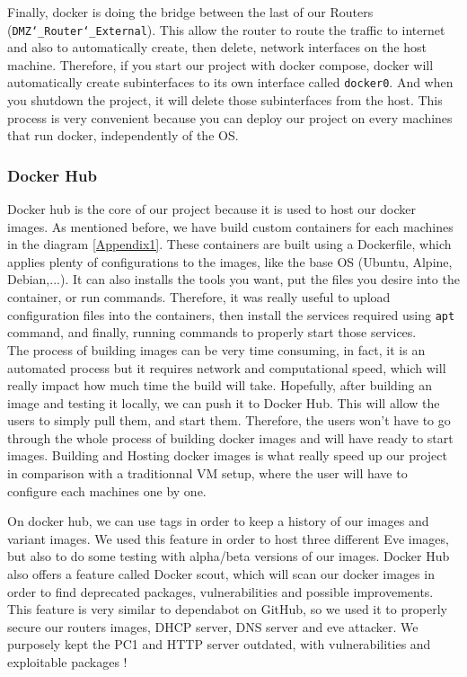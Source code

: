 \documentclass[a4paper,11pt,singlespacing]{article}
\begin{document}
Finally, docker is doing the bridge between the last of our Routers (\texttt{DMZ\char`_Router\char`_External}). This allow the router to route the traffic to internet and also to automatically create, then delete, network interfaces on the host machine. Therefore, if you start our project with docker compose, docker will automatically create subinterfaces to its own interface called \texttt{docker0}. And when you shutdown the project, it will delete those subinterfaces from the host. This process is very convenient because you can deploy our project on every machines that run docker, independently of the OS. 

\subsubsection{Docker Hub}
Docker hub is the core of our project because it is used to host our docker images. As mentioned before, we have build custom containers for each machines in the diagram \ref{Appendix1}. These containers are built using a Dockerfile, which applies plenty of configurations to the images, like the base OS (Ubuntu, Alpine, Debian,...). It can also installs the tools you want, put the files you desire into the container, or run commands. Therefore, it was really useful to upload configuration files into the containers, then install the services required using \texttt{apt} command, and finally, running commands to properly start those services.\\

The process of building images can be very time consuming, in fact, it is an automated process but it requires network and computational speed, which will really impact how much time the build will take. Hopefully, after building an image and testing it locally, we can push it to Docker Hub. This will allow the users to simply pull them, and start them. Therefore, the users won't have to go through the whole process of building docker images and will have ready to start images. Building and Hosting docker images is what really speed up our project in comparison with a traditionnal VM setup, where the user will have to configure each machines one by one.

\newpage

On docker hub, we can use tags in order to keep a history of our images and variant images. We used this feature in order to host three different Eve images, but also to do some testing with alpha/beta versions of our images. Docker Hub also offers a feature called Docker scout, which will scan our docker images in order to find deprecated packages, vulnerabilities and possible improvements. This feature is very similar to dependabot on GitHub, so we used it to properly secure our routers images, DHCP server, DNS server and eve attacker. We purposely kept the PC1 and HTTP server outdated, with vulnerabilities and exploitable packages !
\end{document}
